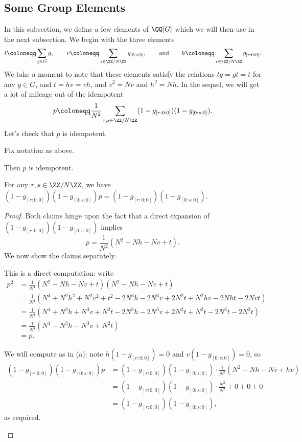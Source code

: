 \documentclass[../thesis.tex]{subfiles}
\begin{document}
\subsection{Some Group Elements}
In this subsection, we define a few elements of $\QQ[G]$ which we will then use in the next subsection. We begin with the three elements
\[t\coloneqq\sum_{g\in G}g,\qquad v\coloneqq\sum_{s\in\ZZ/N\ZZ}g_{[0:s:0]},\qquad\text{and}\qquad h\coloneqq\sum_{r\in\ZZ/N\ZZ}g_{[r:0:0]}.\]
We take a moment to note that these elements satisfy the relations $tg=gt=t$ for any $g\in G$, and $t=hv=vh$, and $v^2=Nv$ and $h^2=Nh$. In the sequel, we will get a lot of mileage out of the idempotent
\[p\coloneqq\frac1{N^2}\sum_{r,s\in\ZZ/N\ZZ}(1-g_{[r:0:0]})(1-g_{[0:s:0]}).\]
Let's check that $p$ is idempotent.
\begin{lemma} \label{lem:}
	Fix notation as above.
	\begin{listalph}
		\item Then $p$ is idempotent.
		\item For any $r,s\in\ZZ/N\ZZ$, we have $(1-g_{[r:0:0]})(1-g_{[0:s:0]})p=(1-g_{[r:0:0]})(1-g_{[0:s:0]})$.
	\end{listalph}
\end{lemma}
\begin{proof}
	Both claims hinge upon the fact that a direct expansion of $(1-g_{[r:0:0]})(1-g_{[0:s:0]})$ implies
	\[p=\frac1{N^2}\left(N^2-Nh-Nv+t\right).\]
	We now show the claims separately.
	\begin{listalph}
		\item This is a direct computation: write
		\begin{align*}
			p^2 &= \frac1{N^4}\left(N^2-Nh-Nv+t\right)\left(N^2-Nh-Nv+t\right) \\
			&= \frac1{N^4}\left(N^4+N^2h^2+N^2v^2+t^2-2N^3h-2N^3v+2N^2t+N^2hv-2Nht-2Nvt\right) \\
			&= \frac1{N^4}\left(N^4+N^3h+N^3v+N^2t-2N^3h-2N^3v+2N^2t+N^2t-2N^2t-2N^2t\right) \\
			&= \frac1{N^4}\left(N^4-N^3h-N^3v+N^2t\right) \\
			&= p.
		\end{align*}
		\item We will compute as in (a): note $h(1-g_{[r:0:0]})=0$ and $v(1-g_{[0:s:0]})=0$, so
		\begin{align*}
			(1-g_{[r:0:0]})(1-g_{[0:s:0]})p &= (1-g_{[r:0:0]})(1-g_{[0:s:0]})\cdot\frac1{N^2}\left(N^2-Nh-Nv+hv\right) \\
			&= (1-g_{[r:0:0]})(1-g_{[0:s:0]})\cdot\frac{N^2}{N^2}+0+0+0 \\
			&= (1-g_{[r:0:0]})(1-g_{[0:s:0]}),
		\end{align*}
		as required.
		\qedhere
	\end{listalph}
\end{proof}
\end{document}

